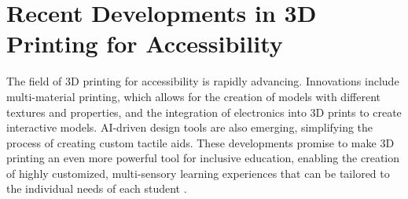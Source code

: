 \section{Recent Developments in 3D Printing for Accessibility}\label{ch5:sec:developments}
The field of 3D printing for accessibility is rapidly advancing. Innovations include multi-material printing, which allows for the creation of models with different textures and properties, and the integration of electronics into 3D prints to create interactive models. AI-driven design tools are also emerging, simplifying the process of creating custom tactile aids. These developments promise to make 3D printing an even more powerful tool for inclusive education, enabling the creation of highly customized, multi-sensory learning experiences that can be tailored to the individual needs of each student \supercite{Jo2016, LumaAI, Meshy}.

